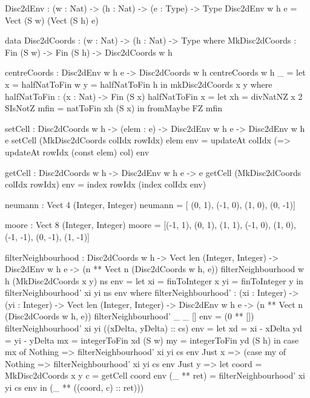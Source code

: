 \begin{HaskellCode}
Disc2dEnv : (w : Nat) -> (h : Nat) -> (e : Type) -> Type
Disc2dEnv w h e = Vect (S w) (Vect (S h) e)

data Disc2dCoords : (w : Nat) -> (h : Nat) -> Type where
  MkDisc2dCoords : Fin (S w) -> Fin (S h) -> Disc2dCoords w h
  
centreCoords : Disc2dEnv w h e -> Disc2dCoords w h
centreCoords {w} {h} _ =
    let x = halfNatToFin w
        y = halfNatToFin h
    in  mkDisc2dCoords x y
  where
    halfNatToFin : (x : Nat) -> Fin (S x)
    halfNatToFin x = 
      let xh   = divNatNZ x 2 SIsNotZ 
          mfin = natToFin xh (S x)
      in  fromMaybe FZ mfin
      
setCell :  Disc2dCoords w h
        -> (elem : e)
        -> Disc2dEnv w h e
        -> Disc2dEnv w h e
setCell (MkDisc2dCoords colIdx rowIdx) elem env 
    = updateAt colIdx (\col => updateAt rowIdx (const elem) col) env
 
getCell :  Disc2dCoords w h
        -> Disc2dEnv w h e
        -> e
getCell (MkDisc2dCoords colIdx rowIdx) env
    = index rowIdx (index colIdx env)
    
neumann : Vect 4 (Integer, Integer)
neumann = [         (0,  1), 
           (-1,  0),         (1,  0),
                    (0, -1)]

moore : Vect 8 (Integer, Integer)
moore = [(-1,  1), (0,  1), (1,  1),
         (-1,  0),          (1,  0),
         (-1, -1), (0, -1), (1, -1)]

filterNeighbourhood :  Disc2dCoords w h
                    -> Vect len (Integer, Integer)
                    -> Disc2dEnv w h e 
                    -> (n ** Vect n (Disc2dCoords w h, e))
filterNeighbourhood {w} {h} (MkDisc2dCoords x y) ns env =
    let xi = finToInteger x
        yi = finToInteger y
    in  filterNeighbourhood' xi yi ns env
  where
    filterNeighbourhood' :  (xi : Integer)
                         -> (yi : Integer)
                         -> Vect len (Integer, Integer)
                         -> Disc2dEnv w h e 
                         -> (n ** Vect n (Disc2dCoords w h, e))
    filterNeighbourhood' _ _ [] env = (0 ** [])
    filterNeighbourhood' xi yi ((xDelta, yDelta) :: cs) env 
      = let xd = xi - xDelta
            yd = yi - yDelta
            mx = integerToFin xd (S w)
            my = integerToFin yd (S h)
        in case mx of
            Nothing => filterNeighbourhood' xi yi cs env 
            Just x  => (case my of 
                        Nothing => filterNeighbourhood' xi yi cs env 
                        Just y  => let coord      = MkDisc2dCoords x y
                                       c          = getCell coord env
                                       (_ ** ret) = filterNeighbourhood' xi yi cs env
                                   in  (_ ** ((coord, c) :: ret)))
\end{HaskellCode}

